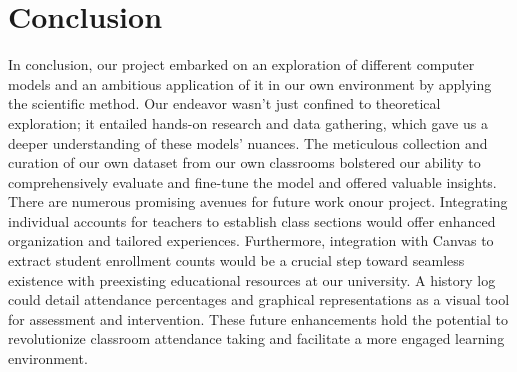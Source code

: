 \section{Conclusion}
\label{sec:conclusion}
In conclusion, our project embarked on an exploration of different computer models and an ambitious application of it in our own environment by applying the scientific method. Our endeavor wasn't just confined to theoretical exploration; it entailed hands-on research and data gathering, which gave us a deeper understanding of these models' nuances. The meticulous collection and curation of our own dataset from our own classrooms bolstered our ability to comprehensively evaluate and fine-tune the model and offered valuable insights.\\
There are numerous promising avenues for future work onour project. Integrating individual accounts for teachers to establish class sections would offer enhanced organization and tailored experiences. Furthermore, integration with Canvas to extract student enrollment counts would be a crucial step toward seamless existence with preexisting educational resources at our university. A history log could detail attendance percentages and graphical representations as a visual tool for assessment and intervention. These future enhancements hold the potential to revolutionize classroom attendance taking and facilitate a more engaged learning environment.
